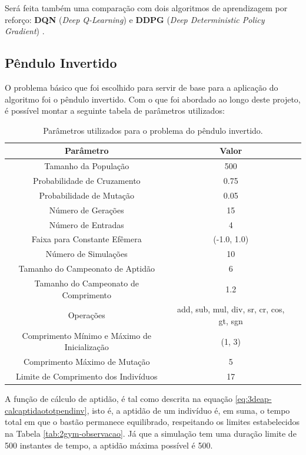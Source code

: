 Será feita também uma comparação com dois algoritmos de aprendizagem por reforço: \textbf{DQN} (\textit{Deep Q-Learning}) \cite{silver2013dqn} e \textbf{DDPG} (\textit{Deep Deterministic Policy Gradient}) \cite{lili2015ddpg}.


\subsection{Pêndulo Invertido}\label{ssec:4ec-cartpole}
O problema básico que foi escolhido para servir de base para a aplicação do algoritmo foi o pêndulo invertido. Com o que foi abordado ao longo deste projeto, é possível montar a seguinte tabela de parâmetros utilizados:

\begin{table}[H]
	\centering
	\begin{tabular}{SSS} \toprule
		{Parâmetro} & {Valor} \\ \midrule
		{Tamanho da População} & {500} \\
		{Probabilidade de Cruzamento} & {0.75} \\
		{Probabilidade de Mutação} & {0.05} \\
		{Número de Gerações} & {15} \\
		{Número de Entradas} & {4} \\
		{Faixa para Constante Efêmera} & {(-1.0, 1.0)} \\
		{Número de Simulações} & {10} \\
		{Tamanho do Campeonato de Aptidão} & {6} \\
		{Tamanho do Campeonato de Comprimento} & {1.2} \\
		{Operações} & {add, sub, mul, div, sr, cr, cos, gt, sgn} \\
		{Comprimento Mínimo e Máximo de Inicialização} & {(1, 3)} \\
		{Comprimento Máximo de Mutação} & {5} \\
		{Limite de Comprimento dos Indivíduos} & {17} \\
		\bottomrule
	\end{tabular}
	\caption{Parâmetros utilizados para o problema do pêndulo invertido.}\label{tab:4ec-param-cartpole}
\end{table}

A função de cálculo de aptidão, é tal como descrita na equação \ref{eq:3deap-calcaptidaototpendinv}, isto é, a aptidão de um indivíduo é, em suma, o tempo total em que o bastão permanece equilibrado, respeitando os limites estabelecidos na Tabela \ref{tab:2gym-observacao}. Já que a simulação tem uma duração limite de 500 instantes de tempo, a aptidão máxima possível é 500.

